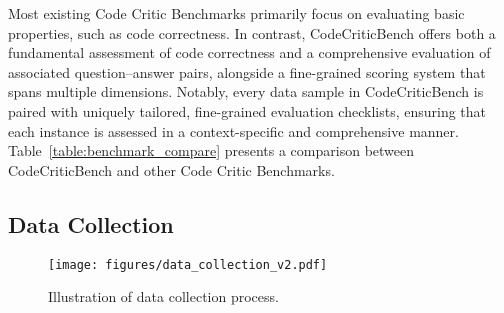 \documentclass[11pt, a4paper, logo, copyright, nonumbering, amsart]{map}
\begin{document}
\begin{CJK*}{UTF8}{gbsn}
Most existing Code Critic Benchmarks primarily focus on evaluating basic properties, such as code correctness. In contrast, CodeCriticBench offers both a fundamental assessment of code correctness and a comprehensive evaluation of associated question–answer pairs, alongside a fine-grained scoring system that spans multiple dimensions. Notably, every data sample in CodeCriticBench is paired with uniquely tailored, fine-grained evaluation checklists, ensuring that each instance is assessed in a context-specific and comprehensive manner. Table~\ref{table:benchmark_compare} presents a comparison between CodeCriticBench and other Code Critic Benchmarks.

\begin{table}[t]
    \centering \small
    \caption{Comparisons between CodeCriticBench and other benchmarks. ``Code Gen'' denotes ``Code Generation''. ``-'' represents that the corresponding task is not included in the dataset.} \label{table:benchmark_compare}
\end{table}


\subsection{Data Collection}

\begin{wrapfigure}{r}{0.6\textwidth}
    \centering
    \texttt{[image: figures/data\_collection\_v2.pdf]}
    \caption{Illustration of data collection process.} \label{fig:data_collection}
\end{wrapfigure}


\end{CJK*}
\end{document}
